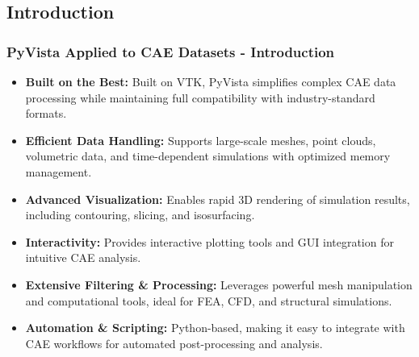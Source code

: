 \documentclass[t]{beamer}
\begin{document}
\subsection{Introduction}
\begin{frame}

    \frametitle{PyVista Applied to CAE Datasets - Introduction}

    \begin{itemize}[leftmargin=10pt, label=•]
        \item \textbf{Built on the Best:} Built on VTK, PyVista simplifies complex CAE data processing while maintaining full compatibility with industry-standard formats.
        \item \textbf{Efficient Data Handling:} Supports large-scale meshes, point clouds, volumetric data, and time-dependent simulations with optimized memory management.
        \item \textbf{Advanced Visualization:} Enables rapid 3D rendering of simulation results, including contouring, slicing, and isosurfacing.
        \item \textbf{Interactivity:} Provides interactive plotting tools and GUI integration for intuitive CAE analysis.
        \item \textbf{Extensive Filtering & Processing:} Leverages powerful mesh manipulation and computational tools, ideal for FEA, CFD, and structural simulations.
        \item \textbf{Automation & Scripting:} Python-based, making it easy to integrate with CAE workflows for automated post-processing and analysis.
    \end{itemize}

\end{frame}
\end{document}
